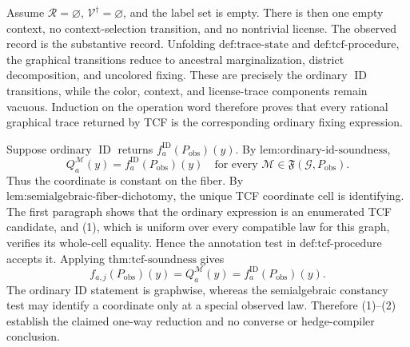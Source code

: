 Assume \(\mathcal R=\varnothing\), \(\mathcal V^{\dagger}=\varnothing\), and the label set is empty.  There is then one empty context, no context-selection transition, and no nontrivial license.  The observed record is the substantive record.  Unfolding \(\text{def:trace-state}\) and \(\text{def:tcf-procedure}\), the graphical transitions reduce to ancestral marginalization, district decomposition, and uncolored fixing.  These are precisely the ordinary \(\operatorname{ID}\) transitions, while the color, context, and license-trace components remain vacuous.  Induction on the operation word therefore proves that every rational graphical trace returned by TCF is the corresponding ordinary fixing expression.

Suppose ordinary \(\operatorname{ID}\) returns \(f_a^{\mathrm{ID}}(P_{\mathrm{obs}})(y)\).  By \(\text{lem:ordinary-id-soundness}\),
\[
Q_a^{\mathcal M}(y)
=f_a^{\mathrm{ID}}(P_{\mathrm{obs}})(y)
\quad\text{for every }\mathcal M\in\mathfrak F(\mathcal G,P_{\mathrm{obs}}).
\tag{1}
\]
Thus the coordinate is constant on the fiber.  By \(\text{lem:semialgebraic-fiber-dichotomy}\), the unique TCF coordinate cell is identifying.  The first paragraph shows that the ordinary expression is an enumerated TCF candidate, and (1), which is uniform over every compatible law for this graph, verifies its whole-cell equality.  Hence the annotation test in \(\text{def:tcf-procedure}\) accepts it.  Applying \(\text{thm:tcf-soundness}\) gives
\[
f_{a,j}(P_{\mathrm{obs}})(y)
=Q_a^{\mathcal M}(y)
=f_a^{\mathrm{ID}}(P_{\mathrm{obs}})(y).
\tag{2}
\]
The ordinary ID statement is graphwise, whereas the semialgebraic constancy test may identify a coordinate only at a special observed law.  Therefore (1)--(2) establish the claimed one-way reduction and no converse or hedge-compiler conclusion.